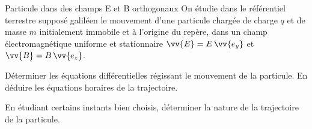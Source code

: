 \begin{exo}[PCSI][1][colle]{Particule dans des champs E et B orthogonaux}
  On étudie dans le référentiel terrestre supposé galiléen le mouvement d'une particule chargée de charge $q$ et de masse $m$ initialement immobile et à l'origine du repère, dans un champ électromagnétique uniforme et stationnaire $\vv{E}=E\,\vv{e_y}$ et $\vv{B}=B\,\vv{e_z}$.
  \begin{quest}
  \item Déterminer les équations différentielles régissant le mouvement de la particule. En déduire les équations horaires de la trajectoire.
  \item En étudiant certains instants bien choisis, déterminer la nature de la trajectoire de la particule.
  \end{quest}
  \end{exo}

